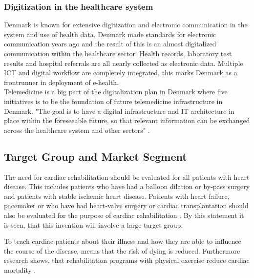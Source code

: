 

\subsubsection{Digitization in the healthcare system}

Denmark is known for extensive digitization and electronic communication in the system and use of health data. Denmark made standards for electronic communication years ago and the result of this is an almost digitalized communication within the healthcare sector. Health records, laboratory test results and hospital referrals are all nearly collected as electronic data. 
Multiple ICT and digital workflow are completely integrated, this marks Denmark as a frontrunner in deployment of e-health.\\
Telemedicine is a big part of the digitalization plan in Denmark where five initiatives is to be the foundation of future telemedicine infrastructure in Denmark. "The goal is to have a digital infrastructure and IT architecture in place within the foreseeable future, so that relevant information can be exchanged across the healthcare system and other sectors" \cite{Healthcareindk2}. 





\subsection{Target Group and Market Segment}

The need for cardiac rehabilitation should be evaluated for all patients with heart disease. This includes patients who have had a balloon dilation or by-pass surgery and patients with stable ischemic heart disease.
Patients with heart failure, pacemaker or who have had heart-valve surgery or cardiac transplantation should also be evaluated for the purpose of cardiac rehabilitation \cite{Rehabilitering}. By this statement it is seen, that this invention will involve a large target group. 

To teach cardiac patients about their illness and how they are able to influence the course of the disease, means that the risk of dying is reduced. Furthermore research shows, that rehabilitation programs with physical exercise reduce cardiac mortality \cite{Hjerteforening}.    


